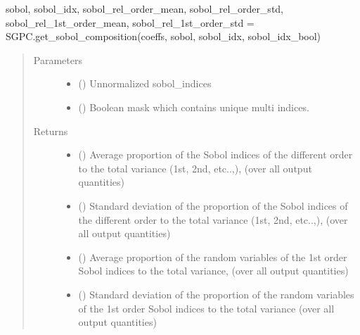 \documentclass[letterpaper,10pt,english,openany,oneside]{sphinxmanual}
\begin{document}
\begin{fulllineitems}
\begin{fulllineitems}
sobol, sobol\_idx, sobol\_rel\_order\_mean, sobol\_rel\_order\_std, sobol\_rel\_1st\_order\_mean, sobol\_rel\_1st\_order\_std
= SGPC.get\_sobol\_composition(coeffs, sobol, sobol\_idx, sobol\_idx\_bool)
\begin{quote}\begin{description}
\item[{Parameters}] \leavevmode\begin{itemize}
\item {} 
 (\sphinxstyleliteralemphasis{\sphinxupquote{ {[}}}\sphinxstyleliteralemphasis{\sphinxupquote{{]}}}) \textendash{} Unnormalized sobol\_indices

\item {} 
 () \textendash{} Boolean mask which contains unique multi indices.

\end{itemize}

\item[{Returns}] \leavevmode
\begin{itemize}
\item {} 
 () \textendash{} Average proportion of the Sobol indices of the different order to the total variance (1st, 2nd, etc..,),
(over all output quantities)

\item {} 
 () \textendash{} Standard deviation of the proportion of the Sobol indices of the different order to the total variance
(1st, 2nd, etc..,), (over all output quantities)

\item {} 
 () \textendash{} Average proportion of the random variables of the 1st order Sobol indices to the total variance,
(over all output quantities)

\item {} 
 () \textendash{} Standard deviation of the proportion of the random variables of the 1st order Sobol indices to the total
variance
(over all output quantities)


\end{itemize}
\end{description}
\end{quote}
\end{fulllineitems}
\end{fulllineitems}
\end{document}
